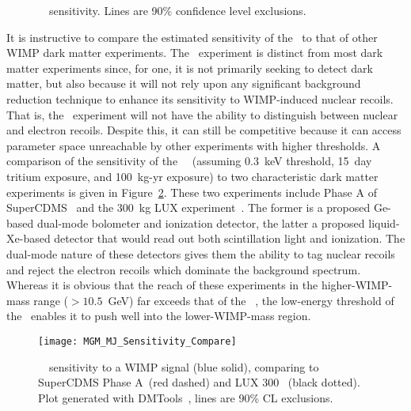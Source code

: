 			\begin{figure}
				\centering
				\def\figheight{0.41\textheight}				
				\caption[\MJ~\minmod~sensitivity to a WIMP signal]{\MJ~\minmod~sensitivity.  Lines are 90\% confidence level exclusions.}
				\label{fig:MJSensitivityToWIMP}
			\end{figure}		
	
	It is instructive to compare the estimated sensitivity of the \minmod~to that of other WIMP dark matter experiments.  The \MJ~experiment is distinct from most dark matter experiments since, for one, it is not primarily seeking to detect dark matter, but also because it will not rely upon any significant background reduction technique to enhance its sensitivity to WIMP-induced nuclear recoils.  That is, the \MJ~experiment will not have the ability to distinguish between nuclear and electron recoils.  Despite this, it can still be competitive because it can access parameter space unreachable by other experiments with higher thresholds.  A comparison of the sensitivity of the \MJ~\minmod~(assuming 0.3~keV threshold, 15~day tritium exposure, and 100~kg-yr exposure) to two characteristic dark matter experiments is given in Figure~\ref{fig:MJSensitivityToWIMPCompare}.  These two experiments include Phase A of SuperCDMS~\cite{Akerib2006411} and the 300~kg LUX experiment~\cite{LUX300}.  The former is a proposed Ge-based dual-mode bolometer and ionization detector, the latter a proposed liquid-Xe-based detector that would read out both scintillation light and ionization.  The dual-mode nature of these detectors gives them the ability to tag nuclear recoils and reject the electron recoils which dominate the background spectrum.  Whereas it is obvious that the reach of these experiments in the higher-WIMP-mass range ($>10.5$~GeV) far exceeds that of the \MJ~\minmod, the low-energy threshold of the \minmod~enables it to push well into the lower-WIMP-mass region.  
		
			\begin{figure}
				\centering
				\texttt{[image: MGM\_MJ\_Sensitivity\_Compare]}
				\caption[\MJ~\minmod~sensitivity to a WIMP signal, comparing to SuperCDMS Phase A and LUX 300.]
				{\MJ~\minmod~sensitivity to a WIMP signal (blue solid), comparing to SuperCDMS Phase A~\cite{Akerib2006411}(red dashed) and LUX 300~\cite{LUX300}
				(black dotted).  Plot generated with DMTools~\cite{Gai03}, lines are 90\% CL exclusions.}
				\label{fig:MJSensitivityToWIMPCompare}
			\end{figure}			
			

